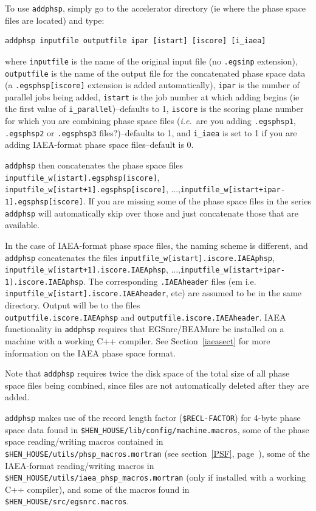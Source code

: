 \documentclass[12pt,twoside]{article}
\newcommand{\ie}{{\em i.e.}}
\begin{document}
To use {\tt addphsp},
simply go to the accelerator directory (ie where the phase space files
are located) and type:
\begin{verbatim}
addphsp inputfile outputfile ipar [istart] [iscore] [i_iaea]
\end{verbatim}
where {\tt inputfile} is the name of the original input file
(no {\tt .egsinp} extension), {\tt outputfile} is the name of the output file
for the concatenated phase space data (a {\tt .egsphsp[iscore]} extension
is added automatically), {\tt ipar} is the number of parallel jobs being
added, {\tt istart} is the job number at which adding begins
(ie the first value of {\tt i\_parallel})--defaults to 1,
{\tt iscore} is the scoring plane number
for which you are combining phase space files (\ie\ are
you adding {\tt .egsphsp1}, {\tt .egsphsp2} or {\tt .egsphsp3} files?)--defaults
to 1, and {\tt i\_iaea} is set to 1 if you are adding IAEA-format phase
space files--default is 0.

{\tt addphsp} then concatenates the phase space files
{\tt inputfile\_w[istart].egsphsp[iscore]},
{\tt inputfile\_w[istart+1].egsphsp[iscore]},
...,{\tt inputfile\_w[istart+ipar-1].egsphsp[iscore]}.  If you are missing some of the phase space files in the series
{\tt addphsp} will automatically skip over those and just concatenate those
that are available.

In the case
of IAEA-format phase space files, the naming scheme is different, and
{\tt addphsp} concatenates the files
{\tt inputfile\_w[istart].iscore.IAEAphsp},\\
{\tt inputfile\_w[istart+1].iscore.IAEAphsp},
...,{\tt inputfile\_w[istart+ipar-1].iscore.IAEAphsp}.
The corresponding {\tt .IAEAheader} files
({em i.e.} {\tt inputfile\_w[istart].iscore.IAEAheader}, etc)
are assumed to be in the
same directory.  Output will be to the files\\
{\tt outputfile.iscore.IAEAphsp} and {\tt outputfile.iscore.IAEAheader}.
IAEA functionality in {\tt addphsp} requires that EGSnrc/BEAMnrc be
installed on a machine with a working C++ compiler.  See
Section~\ref{iaeasect} for more information on the IAEA phase space format.

Note that {\tt addphsp} requires twice the disk space of the total size of
all phase space files being combined, since files are not automatically
deleted after they are added.

{\tt addphsp} makes use of the record length factor ({\tt \$RECL-FACTOR}) for
4-byte phase space data found in {\tt \$HEN\_HOUSE/lib/config/machine.macros},
some of the phase space reading/writing
macros contained in {\tt \$HEN\_HOUSE/utils/phsp\_macros.mortran}
(see section~\ref{PSF}, page~\pageref{PSF}), some of
the IAEA-format reading/writing macros in \\
{\tt \$HEN\_HOUSE/utils/iaea\_phsp\_macros.mortran}
(only if installed with a working C++ compiler), and
some of the macros
found in  {\tt \$HEN\_HOUSE/src/egsnrc.macros}.
\end{document}
